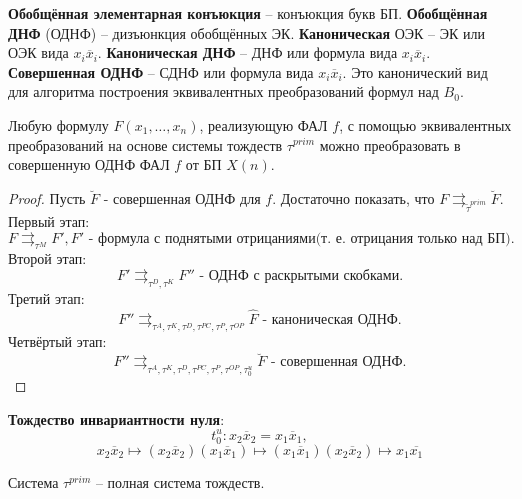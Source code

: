 \documentclass[11pt]{article}
\newcounter{th}\setcounter{th}{0}
\newcounter{stnmt}\setcounter{stnmt}{0}
\def\st{\par\smallskip\refstepcounter{stnmt}\textbf{\arabic{stnmt}}}
\newtheorem*{Statement}{Утверждение \st}
\begin{document}
\textbf{Обобщённая элементарная конъюкция} -- конъюкция букв БП. \textbf{Обобщённая ДНФ} (ОДНФ) -- дизъюнкция
обобщённых ЭК. \textbf{Каноническая} ОЭК -- ЭК или ОЭК вида \(x_i\overline{x}_i\). \textbf{Каноническая ДНФ} --
ДНФ или формула вида \(x_i\overline{x}_i\). \textbf{Совершенная ОДНФ} -- СДНФ или формула вида \(x_i\overline{x}_i\).
Это канонический вид для алгоритма построения эквивалентных преобразований формул над \(B_0\).
\begin{Statement}
Любую формулу $F(x_1, \ldots, x_n)$, реализующую ФАЛ $f$, с помощью эквивалентных преобразований
на основе системы тождеств $\tau^{prim}$ можно преобразовать в совершенную ОДНФ ФАЛ $f$ от БП $X(n)$.
\end{Statement}
\begin{proof}
Пусть $\breve{F}$ - совершенная ОДНФ для $f$. Достаточно показать, что
$F \rightrightarrows_{\tilde{\tau}^{prim}}\breve{F}$.
Первый этап:
\begin{equation}
F \rightrightarrows_{\tau^M}F', F'\text{ - формула с поднятыми отрицаниями(т. е. отрицания только над БП).}
\end{equation}
Второй этап:
\begin{equation}
F' \rightrightarrows_{\tau^D, \tau^K} F''\text{ - ОДНФ с раскрытыми скобками.}
\end{equation}
Третий этап:
\begin{equation}
F'' \rightrightarrows_{\tau^A, \tau^K, \tau^D, \tau^{PC}, \tau^P, \tau^{OP}} \hat{F}\text{ - каноническая ОДНФ.}
\end{equation}
Четвёртый этап:
\begin{equation}
F'' \rightrightarrows_{\tau^A, \tau^K, \tau^D, \tau^{PC}, \tau^P, \tau^{OP}, \tau^u_0} \breve{F}\text{ - совершенная ОДНФ.}
\end{equation}
\end{proof}
\textbf{Тождество инвариантности нуля}:
\begin{equation}
t^u_0: x_2\overline{x}_2 = x_1\overline{x}_1,
\end{equation}
\begin{equation}
x_2\overline{x}_2 \mapsto (x_2\overline{x}_2)(x_1\overline{x}_1) \mapsto (x_1\overline{x}_1)
(x_2\overline{x}_2) \mapsto x_1\overline{x_1}
\end{equation}
\begin{Statement}
Система $\tau^{prim}$ -- полная система тождеств.
\end{Statement}
\end{document}
